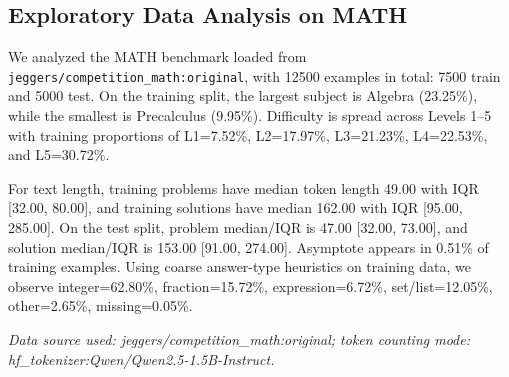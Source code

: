 \subsection{Exploratory Data Analysis on MATH}
We analyzed the MATH benchmark loaded from \texttt{jeggers/competition\_math:original}, with 12500 examples in total: 7500 train and 5000 test. On the training split, the largest subject is Algebra (23.25\%), while the smallest is Precalculus (9.95\%). Difficulty is spread across Levels 1--5 with training proportions of L1=7.52\%, L2=17.97\%, L3=21.23\%, L4=22.53\%, and L5=30.72\%.

For text length, training problems have median token length 49.00 with IQR [32.00, 80.00], and training solutions have median 162.00 with IQR [95.00, 285.00]. On the test split, problem median/IQR is 47.00 [32.00, 73.00], and solution median/IQR is 153.00 [91.00, 274.00]. Asymptote appears in 0.51\% of training examples. Using coarse answer-type heuristics on training data, we observe integer=62.80\%, fraction=15.72\%, expression=6.72\%, set/list=12.05\%, other=2.65\%, missing=0.05\%.

\noindent\textit{Data source used: jeggers/competition\_math:original; token counting mode: hf\_tokenizer:Qwen/Qwen2.5-1.5B-Instruct.}
